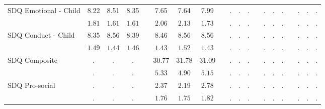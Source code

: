 \begin{center}
{\begin{longtable}{L{5cm} c c c p{.5cm} c c c p{.5cm} c c c p{.5cm} c c c p{.5cm} c c c}
 \quad SDQ Emotional - Child & 8.22 &      8.51 &      8.35 & &      7.65 &      7.64 &      7.99 & &         . &         . &         . & &         . &         . &         . & &         . &         . &         . \\*
 \quad & $\mathit{     1.81}$ & $\mathit{     1.61}$ & $\mathit{     1.61}$ & & $\mathit{     2.06}$ & $\mathit{     2.13}$ & $\mathit{     1.73}$ & & $\mathit{        .}$ & $\mathit{        .}$ & $\mathit{        .}$ & & $\mathit{        .}$ & $\mathit{        .}$ & $\mathit{        .}$ & & $\mathit{        .}$ & $\mathit{        .}$ & $\mathit{        .}$ \\[.2em]
 \quad SDQ Conduct - Child & 8.35 &      8.56 &      8.39 & &      8.46 &      8.56 &      8.56 & &         . &         . &         . & &         . &         . &         . & &         . &         . &         . \\*
 \quad & $\mathit{     1.49}$ & $\mathit{     1.44}$ & $\mathit{     1.46}$ & & $\mathit{     1.43}$ & $\mathit{     1.52}$ & $\mathit{     1.43}$ & & $\mathit{        .}$ & $\mathit{        .}$ & $\mathit{        .}$ & & $\mathit{        .}$ & $\mathit{        .}$ & $\mathit{        .}$ & & $\mathit{        .}$ & $\mathit{        .}$ & $\mathit{        .}$ \\[.2em]
 \quad SDQ Composite & . &         . &         . & &     30.77 &     31.78 &     31.09 & &         . &         . &         . & &         . &         . &         . & &         . &         . &         . \\*
 \quad & $\mathit{        .}$ & $\mathit{        .}$ & $\mathit{        .}$ & & $\mathit{     5.33}$ & $\mathit{     4.90}$ & $\mathit{     5.15}$ & & $\mathit{        .}$ & $\mathit{        .}$ & $\mathit{        .}$ & & $\mathit{        .}$ & $\mathit{        .}$ & $\mathit{        .}$ & & $\mathit{        .}$ & $\mathit{        .}$ & $\mathit{        .}$ \\[.2em]
 \quad SDQ Pro-social & . &         . &         . & &      2.37 &      2.19 &      2.78 & &         . &         . &         . & &         . &         . &         . & &         . &         . &         . \\*
 \quad & $\mathit{        .}$ & $\mathit{        .}$ & $\mathit{        .}$ & & $\mathit{     1.76}$ & $\mathit{     1.75}$ & $\mathit{     1.82}$ & & $\mathit{        .}$ & $\mathit{        .}$ & $\mathit{        .}$ & & $\mathit{        .}$ & $\mathit{        .}$ & $\mathit{        .}$ & & $\mathit{        .}$ & $\mathit{        .}$ & $\mathit{        .}$ \\[.2em]

\end{longtable}}
\end{center}
